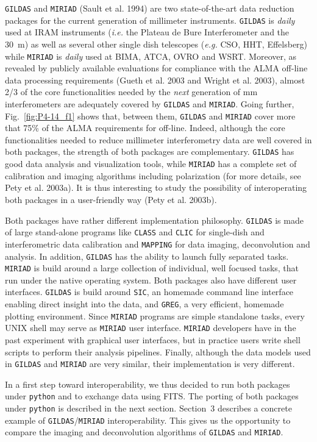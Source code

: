 \documentclass[11pt,twoside]{article}  %
\newcommand{\GILDAS}{\texttt{GILDAS}}
\newcommand{\MIRIAD}{\texttt{MIRIAD}}
\newcommand{\python}{\texttt{python}}
\newcommand{\SIC}{\texttt{SIC}}
\newcommand{\GREG}{\texttt{GREG}}
\newcommand{\CLASS}{\texttt{CLASS}}
\newcommand{\CLIC}{\texttt{CLIC}}
\newcommand{\MAPPING}{\texttt{MAPPING}}
\newcommand{\ALMA}{\textrm{ALMA}}
\newcommand{\IRAM}{\textrm{IRAM}}
\newcommand{\CSO}{\textrm{CSO}}
\newcommand{\ie} {{\em i.e.}}
\newcommand{\eg} {{\em e.g.}}
\begin{document}
\GILDAS{} and \MIRIAD{} (Sault et al. 1994) are two state-of-the-art data
reduction packages for the current generation of millimeter instruments.
\GILDAS{} is \emph{daily} used at \IRAM{} instruments (\ie{} the Plateau de
Bure Interferometer and the 30~m) as well as several other single dish
telescopes (\eg{} \CSO{}, HHT, Effelsberg) while \MIRIAD{} is \emph{daily}
used at BIMA, ATCA, OVRO and WSRT. Moreover, as revealed by publicly
available evaluations for compliance with the \ALMA{} off-line data
processing requirements (Gueth et al. 2003 and Wright et al. 2003), almost
2/3 of the core functionalities needed by the \emph{next} generation of mm
interferometers are adequately covered by \GILDAS{} and \MIRIAD{}.  Going
further, Fig.~\ref{fig:P4-14_f1} shows that, between them, \GILDAS{} and
\MIRIAD{} cover more that 75\% of the \ALMA{} requirements for off-line.
Indeed, although the core functionalities needed to reduce millimeter
interferometry data are well covered in both packages, the strength of both
packages are complementary.  \GILDAS{} has good data analysis and
visualization tools, while \MIRIAD{} has a complete set of calibration and
imaging algorithms including polarization (for more details, see Pety et
al. 2003a). It is thus interesting to study the possibility of
interoperating both packages in a user-friendly way (Pety et al. 2003b).

Both packages have rather different implementation philosophy. \GILDAS{} is
made of large stand-alone programs like \CLASS{} and \CLIC{} for
single-dish and interferometric data calibration and \MAPPING{} for data
imaging, deconvolution and analysis. In addition, \GILDAS{} has the ability
to launch fully separated tasks.  \MIRIAD{} is build around a large
collection of individual, well focused tasks, that run under the native
operating system.  Both packages also have different user interfaces.
\GILDAS{} is build around \SIC{}, an homemade command line interface
enabling direct insight into the data, and \GREG{}, a very efficient,
homemade plotting environment.  Since \MIRIAD{} programs are simple
standalone tasks, every UNIX shell may serve as \MIRIAD{} user interface.
\MIRIAD{} developers have in the past experiment with graphical user
interfaces, but in practice users write shell scripts to perform their
analysis pipelines.  Finally, although the data models used in \GILDAS{}
and \MIRIAD{} are very similar, their implementation is very different.

In a first step toward interoperability, we thus decided to run both
packages under \python{} and to exchange data using FITS.  The porting of both
packages under \python{} is described in the next section. Section~3 describes
a concrete example of \GILDAS{}/\MIRIAD{} interoperability. This gives us
the opportunity to compare the imaging and deconvolution algorithms of
\GILDAS{} and \MIRIAD{}.
\end{document}
